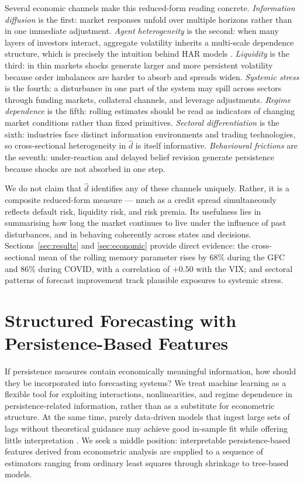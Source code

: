 \documentclass[11pt,a4paper]{article}
\newcommand{\dhat}{\hat d}
\begin{document}
Several economic channels make this reduced-form reading concrete.
\emph{Information diffusion} is the first: market responses unfold over
multiple horizons rather than in one immediate adjustment.
\emph{Agent heterogeneity} is the second: when many layers of investors
interact, aggregate volatility inherits a multi-scale dependence
structure, which is precisely the intuition behind HAR models
\citep{muller1997volatilities,corsi2009simple}.
\emph{Liquidity} is the third: in thin markets shocks generate larger
and more persistent volatility because order imbalances are harder to
absorb and spreads widen. \emph{Systemic stress} is the fourth: a
disturbance in one part of the system may spill across sectors through
funding markets, collateral channels, and leverage adjustments.
\emph{Regime dependence} is the fifth: rolling estimates should be read
as indicators of changing market conditions rather than fixed
primitives. \emph{Sectoral differentiation} is the sixth: industries
face distinct information environments and trading technologies, so
cross-sectional heterogeneity in $\dhat$ is itself informative.
\emph{Behavioural frictions} are the seventh: under-reaction and delayed
belief revision generate persistence because shocks are not absorbed in
one step.

We do not claim that $\dhat$ identifies any of these channels uniquely.
Rather, it is a composite reduced-form measure --- much as a credit spread
simultaneously reflects default risk, liquidity risk, and risk premia.
Its usefulness lies in summarising how long the market continues to live
under the influence of past disturbances, and in behaving coherently
across states and decisions. Sections~\ref{sec:results}
and \ref{sec:economic} provide direct evidence: the cross-sectional mean
of the rolling memory parameter rises by 68\% during the GFC and 86\%
during COVID, with a correlation of $+0.50$ with the VIX; and
sectoral patterns of forecast improvement track plausible exposures
to systemic stress.

\section{Structured Forecasting with Persistence-Based Features}
\label{sec:ml}

If persistence measures contain economically meaningful information, how
should they be incorporated into forecasting systems? We treat machine
learning as a flexible tool for exploiting interactions, nonlinearities,
and regime dependence in persistence-related information, rather than as
a substitute for econometric structure. At the same time, purely
data-driven models that ingest large sets of lags without theoretical
guidance may achieve good in-sample fit while offering little
interpretation \citep{gu2020empirical,hastie2009elements}. We seek a
middle position: interpretable persistence-based features derived from
econometric analysis are supplied to a sequence of estimators ranging
from ordinary least squares through shrinkage to tree-based models.
\end{document}
